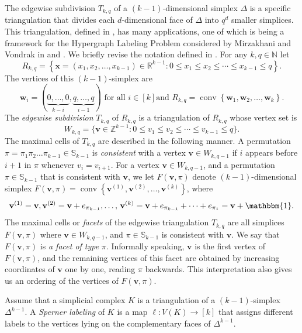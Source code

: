 \documentclass{birkjour}
\theoremstyle{definition}
\theoremstyle{remark}
\numberwithin{equation}{section}
\begin{document}
The edgewise subdivision $T_{k,q}$ of a $(k-1)$-dimensional
simplex $\Delta$ is a specific triangulation that divides each
$d$-dimensional face of $\Delta$ into $q^d$ smaller simplices.
This triangulation, defined in \cite{Edel}, has many applications,
one of which is being a framework for the Hypergraph Labeling
Problem considered by Mirzakhani and Vondrak in \cite{M-V} and
\cite{M-VforM}. We briefly revise the notation defined in
\cite{M-V}. For any $k,q\in \mathbb{N}$ let
$$R_{k,q}=\left\{\mathbf{x}=(x_1,x_2,\ldots,x_{k-1})\in
\mathbb{R}^{k-1}:0\leq x_1\leq x_2\leq \cdots\leq x_{k-1}\leq
q\right\}.$$ The
vertices of this $(k-1)$-simplex are
$$\mathbf{w}_i=(\underbrace{0,\ldots,0}_{k-i},
\underbrace{q,\ldots,q}_{i-1})\textrm{ for all }i\in[k]\textrm{
and } R_{k,q}=
\operatorname{conv}\left\{\mathbf{w}_1,\mathbf{w}_2,\ldots,\mathbf{w}_k\right\}.$$
\noindent The \textit{edgewise subdivision} $T_{k,q}$ of $R_{k,q}$
is a triangulation of $R_{k,q}$ whose vertex set is
$$W_{k,q}=\{\mathbf{v}\in \mathbb{Z}^{k-1}:
0\leq v_1\leq v_2\leq \cdots\leq v_{k-1}\leq q\}.$$
The maximal cells of $T_{k,q}$ are described in the following manner.
A permutation $\pi=\pi_1 \pi_2\ldots\pi_{k-1}\in
 \mathbb{S}_{k-1}$ is \textit{consistent}
 with a vertex $\mathbf{v}\in W_{k,q-1}$ if $i$
 appears before
 $i+1$ in $\pi$
 whenever $v_i=v_{i+1}$.
For a vertex $\mathbf{v}\in W_{k,q-1}$, and a permutation $\pi \in
\mathbb{S}_{k-1}$ that is consistent with $\mathbf{v}$, we let
$F(\mathbf{v},\pi)$ denote $(k-1)$-dimensional simplex
$F(\mathbf{v},\pi)=\operatorname{conv}\left\{\mathbf{v}^{(1)},
\mathbf{v}^{(2)},\ldots,\mathbf{v}^{(k)}\right\}$, where
\begin{equation}\label{E:tjemenahiperivice}
\mathbf{v}^{(1)}=\mathbf{v},
 \mathbf{v}^{(2)}=\mathbf{v}+e_{\pi_{k-1}},
 \ldots\textrm{, }\mathbf{v}^{(k)}=\mathbf{v}+
 e_{\pi_{k-1}}+\cdots+e_{\pi_{1}}=\mathbf{v}+\mathbbm{1}.
\end{equation}
The maximal cells or \textit{facets}
 of the edgewise triangulation $T_{k,q}$ are all
 simplices $ F(\mathbf{v},\pi)$ where $\mathbf{v}\in W_{k,q-1}$, and
 $\pi\in \mathbb{S}_{k-1}$ is consistent with $\mathbf{v}$.
 We say that $F(\mathbf{v},\pi)$ is \emph{a facet of
 type} $\pi$. Informally speaking, $\mathbf{v}$ is the first vertex of
$F(\mathbf{v},\pi)$, and the remaining vertices of this facet are
obtained by increasing coordinates
 of $\mathbf{v}$ one by one,
 reading $\pi$ backwards. This interpretation also gives us
 an ordering of the vertices of $F(\mathbf{v},\pi)$.


Assume that a simplicial complex $K$ is a triangulation of a
$(k-1)$-simplex $\Delta^{k-1}$. A \textit{Sperner labeling} of $K$
is a map $\ell:V(K)\rightarrow [k]$ that assigns different labels
to the vertices lying on the complementary faces of
$\Delta^{k-1}$.
\end{document}
